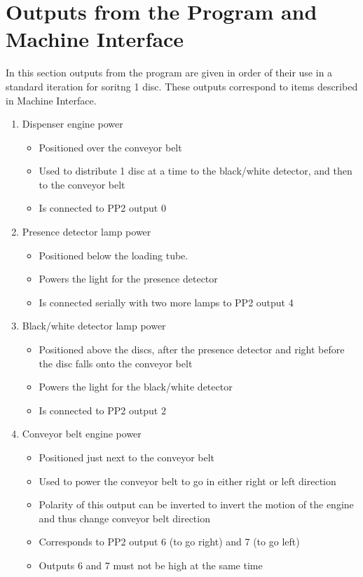 \documentclass[a4paper,oneside,11pt]{report}
\begin{document}
\section{Outputs from the Program and Machine Interface}
In this section outputs from the program are given in order of their use in a standard iteration for soritng 1 disc. These outputs correspond to items described in Machine Interface.
\begin{enumerate}
\item Dispenser engine power
\begin{itemize}
\item Positioned over the conveyor belt
\item Used to distribute 1 disc at a time to the black/white detector, and then to the conveyor belt
\item Is connected to PP2 output 0
\end{itemize}
\item Presence detector lamp power
\begin{itemize}
\item Positioned below the loading tube.
\item Powers the light for the presence detector
\item Is connected serially with two more lamps to PP2 output 4
\end{itemize}
\item Black/white detector lamp power
\begin{itemize}
\item Positioned above the discs, after the presence detector and right before the disc falls onto the conveyor belt
\item Powers the light for the black/white detector
\item Is connected to PP2 output 2
\end{itemize}
\item Conveyor belt engine power
\begin{itemize}
\item Positioned just next to the conveyor belt
\item Used to power the conveyor belt to go in either right or left direction
\item Polarity of this output can be inverted to invert the motion of the engine and thus change conveyor belt direction
\item Corresponds to PP2 output 6 (to go right) and 7 (to go left)
\item Outputs 6 and 7 must not be high at the same time

\end{itemize}
\end{enumerate}
\end{document}
